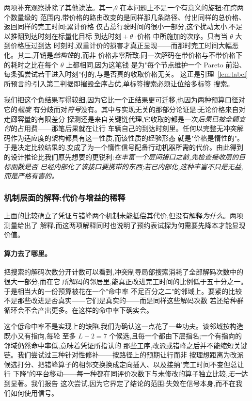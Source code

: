 \documentclass[manuscript,screen,review]{acmart}
\begin{document}
两项补充观察排除了其他读法。其一,$\theta$ 在本问题上不是一个有意义的旋钮:在跨两个数量级的
范围内,带价格的路由改变的是同样那几条路径、付出同样的总价格、返回同样的完工时间;累计价格
仅占总行驶时间的很小一部分,这个扰动太小,不足以推翻到达时刻在标量化目标
$\text{到达时刻}+\theta\cdot\text{价格}$ 中所施加的次序。只有当 $\theta$ 大到价格压过到达
时刻时,双重计价的损害才真正显现——而那时完工时间大幅恶化。其二,开销是\emph{结构性}的,而非
价格非零所致:同一次解码在带价格与不带价格下的耗时之比在每个 $\theta$ 上都相同,因为这笔钱
是为"每个节点维护一个 Pareto 前沿、每条弧尝试若干进入时刻"付的,与是否真的收取价格无关。
这正是引理~\ref{lem:label} 所预言的:引入第二判据即摧毁全序占优,单标签搜索必须让位给多标签
搜索。

我们把这个负结果写得较细,因为它比一个正结果更可迁移,也因为两种预算口径对它的\emph{幅度}
有分歧而对\emph{符号}没有。其中与实现无关的那部分论证是:无论价格来自对走廊容量的有限差分
探测还是来自关键链代理,它收取的都是一次\emph{后果已被全额支付}的占用费——那笔后果就在让行
车辆自己的到达时刻里。任何以完整无冲突解码作为适应度的架构都具有这一性质,而该性质的经验形态
就是"价格是惰性的"。于是决定比较结果的,变成了为一个惰性信号配备行动机器所需的代价。由此得到
的设计推论比我们原先想要的更锐利:\emph{在丰富一个层间接口之前,先检查接收层的目标函数是否
已经内部化了该接口要携带的东西;若已内部化,这种丰富不只是无益,而是严格有害的。}

\subsubsection{机制层面的解释:代价与增益的稀释}
\label{sec:whycost}

上面的比较确立了凭证与错峰两个机制未能抵偿其代价,但没有解释\emph{为什么}。两项测量给出了
解释,而这两项解释同时也说明了预约表试探为何需要先降本才能显现价值。

\paragraph{算力去了哪里。}
把搜索的解码次数分开计数可以看到,冲突制导局部搜索消耗了全部解码次数中的很大一部分,而在它
所解码的邻居里,能真正改进完工时间的比例低于五十分之一。于是相当大的一份预算被花在一个"命中率
不足百分之二"的邻域上。要紧的比较不是那些改进是否真实——它们是真实的——而是同样这些解码次数
若还给种群循环会不会产出更多。在这样的命中率下确实会。

这个低命中率不是实现上的缺陷,我们为确认这一点花了一些功夫。该邻域按构造既小又有指向,每轮
至多 $L+2=7$ 个候选,且每一个都由下层指名;一个有指向的邻域仍然命中率低,意味着凭证所指认的
那些工序,改派或错峰之后并不能缩短关键链。我们尝试过三种针对性修补——按路径上的预期让行而非
按理想距离为改派候选打分、把错峰算子的相邻交换换成定向插入、以及接纳"完工时间不变但总让行
下降"的平台移动——每一种都在同评价次数下与未修改的算子独立比较,\emph{无一}达到显著。我们报告
这次尝试,因为它界定了结论的范围:失效在信号本身,而不在我们如何使用信号。
\end{document}
